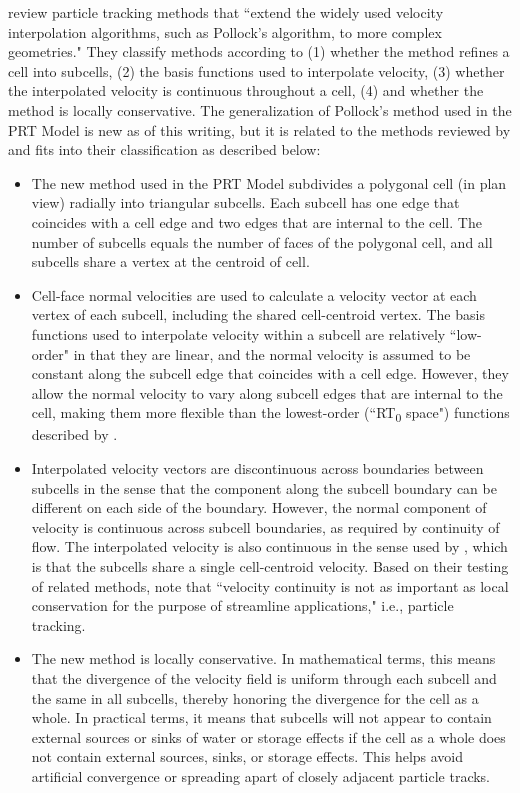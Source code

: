 \cite{zhang2012} review particle tracking methods that ``extend the widely used velocity interpolation algorithms, such as Pollock's algorithm, to more complex geometries." They classify methods according to (1) whether the method refines a cell into subcells, (2) the basis functions used to interpolate velocity, (3) whether the interpolated velocity is continuous throughout a cell, (4) and whether the method is locally conservative. The generalization of Pollock's method used in the PRT Model is new as of this writing, but it is related to the methods reviewed by \cite{zhang2012} and fits into their classification as described below:

\begin{itemize}
\item The new method used in the PRT Model subdivides a polygonal cell (in plan view) radially into triangular subcells. Each subcell has one edge that coincides with a cell edge and two edges that are internal to the cell. The number of subcells equals the number of faces of the polygonal cell, and all subcells share a vertex at the centroid of cell.
\item Cell-face normal velocities are used to calculate a velocity vector at each vertex of each subcell, including the shared cell-centroid vertex. The basis functions used to interpolate velocity within a subcell are relatively ``low-order" in that they are linear, and the normal velocity is assumed to be constant along the subcell edge that coincides with a cell edge. However, they allow the normal velocity to vary along subcell edges that are internal to the cell, making them more flexible than the lowest-order (``RT\textsubscript{0} space") functions described by \cite{zhang2012}.
\item Interpolated velocity vectors are discontinuous across boundaries between subcells in the sense that the component along the subcell boundary can be different on each side of the boundary. However, the normal component of velocity is continuous across subcell boundaries, as required by continuity of flow. The interpolated velocity is also continuous in the sense used by \cite{zhang2012}, which is that the subcells share a single cell-centroid velocity. Based on their testing of related methods, \cite{zhang2012} note that ``velocity continuity is not as important as local conservation for the purpose of streamline applications," i.e., particle tracking.
\item The new method is locally conservative. In mathematical terms, this means that the divergence of the velocity field is uniform through each subcell and the same in all subcells, thereby honoring the divergence for the cell as a whole. In practical terms, it means that subcells will not appear to contain external sources or sinks of water or storage effects if the cell as a whole does not contain external sources, sinks, or storage effects. This helps avoid artificial convergence or spreading apart of closely adjacent particle tracks.
\end{itemize}

